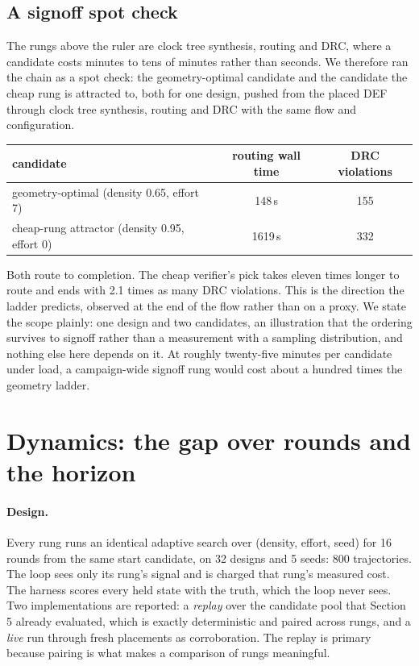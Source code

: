 \documentclass{article}
\begin{document}
\subsection{A signoff spot check}

The rungs above the ruler are clock tree synthesis, routing and DRC, where a candidate
costs minutes to tens of minutes rather than seconds. We therefore ran the chain as a
spot check: the geometry-optimal candidate and the candidate the cheap rung is
attracted to, both for one design, pushed from the placed DEF through clock tree
synthesis, routing and DRC with the same flow and configuration.

\begin{center}
\begin{tabular}{lcc}
\toprule
candidate & routing wall time & DRC violations \\
\midrule
geometry-optimal (density 0.65, effort 7) & 148\,s & 155 \\
cheap-rung attractor (density 0.95, effort 0) & 1619\,s & 332 \\
\bottomrule
\end{tabular}
\end{center}

Both route to completion. The cheap verifier's pick takes eleven times longer to route
and ends with 2.1 times as many DRC violations. This is the direction the ladder
predicts, observed at the end of the flow rather than on a proxy. We state the scope
plainly: one design and two candidates, an illustration that the ordering survives to
signoff rather than a measurement with a sampling distribution, and nothing else here
depends on it. At roughly twenty-five minutes per candidate under load, a
campaign-wide signoff rung would cost about a hundred times the geometry ladder.

\section{Dynamics: the gap over rounds and the horizon}
\label{sec:dynamics}

\paragraph{Design.} Every rung runs an identical adaptive search over (density,
effort, seed) for 16 rounds from the same start candidate, on 32 designs and 5 seeds:
800 trajectories. The loop sees only its rung's signal and is charged that rung's
measured cost. The harness scores every held state with the truth, which the loop
never sees. Two implementations are reported: a \emph{replay} over the candidate pool
that Section 5 already evaluated, which is exactly deterministic and paired across
rungs, and a \emph{live} run through fresh placements as corroboration. The replay is
primary because pairing is what makes a comparison of rungs meaningful.
\end{document}
